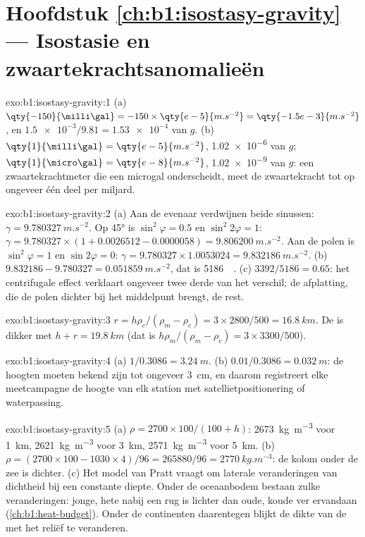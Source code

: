 \section*{Hoofdstuk \ref{ch:b1:isostasy-gravity} --- Isostasie en zwaartekrachtsanomalieën}

\begin{solution}{exo:b1:isostasy-gravity:1}
(a) $\qty{-150}{\milli\gal} = -150\times\qty{e-5}{m.s^{-2}} = \qty{-1.5e-3}{m.s^{-2}}$,
en $\num{1.5e-3}/9.81 = \num{1.53e-4}$ van $g$. (b) $\qty{1}{\milli\gal} =
\qty{e-5}{m.s^{-2}}$, \num{1.02e-6} van $g$; $\qty{1}{\micro\gal} =
\qty{e-8}{m.s^{-2}}$, \num{1.02e-9} van $g$: een zwaartekrachtmeter die een microgal onderscheidt, meet de zwaartekracht tot op ongeveer één deel per miljard.
\end{solution}

\begin{solution}{exo:b1:isostasy-gravity:2}
(a) Aan de evenaar verdwijnen beide sinussen: $\gamma = \qty{9.780327}{m.s^{-2}}$. Op
\ang{45} is $\sin^2\varphi = 0.5$ en $\sin^2 2\varphi = 1$:
$\gamma = 9.780327\times(1 + 0.0026512 - 0.0000058) = \qty{9.806200}{m.s^{-2}}$.
Aan de polen is $\sin^2\varphi = 1$ en $\sin 2\varphi = 0$:
$\gamma = 9.780327\times1.0053024 = \qty{9.832186}{m.s^{-2}}$.
(b) $9.832186 - 9.780327 = \qty{0.051859}{m.s^{-2}}$, dat is
\qty{5186}{\milli\gal}. (c) $3392/5186 = 0.65$: het centrifugale effect verklaart
ongeveer twee derde van het verschil; de afplatting, die de polen dichter bij het middelpunt brengt, de rest.
\end{solution}

\begin{solution}{exo:b1:isostasy-gravity:3}
$r = h\rho_c/(\rho_m - \rho_c) = 3\times2800/500 = \qty{16.8}{km}$. De  is
dikker met $h + r = \qty{19.8}{km}$ (dat is $h\rho_m/(\rho_m - \rho_c) =
3\times3300/500$).
\end{solution}

\begin{solution}{exo:b1:isostasy-gravity:4}
(a) $1/0.3086 = \qty{3.24}{m}$. (b) $0.01/0.3086 = \qty{0.032}{m}$: de hoogten
moeten bekend zijn tot ongeveer \qty{3}{cm}, en daarom registreert elke meetcampagne de hoogte van elk station met satellietpositionering of waterpassing.
\end{solution}

\begin{solution}{exo:b1:isostasy-gravity:5}
(a) $\rho = 2700\times100/(100 + h)$: \qty{2673}{kg.m^{-3}} voor \qty{1}{km},
\qty{2621}{kg.m^{-3}} voor \qty{3}{km}, \qty{2571}{kg.m^{-3}} voor \qty{5}{km}.
(b) $\rho = (2700\times100 - 1030\times4)/96 = \num{265880}/96 =
\qty{2770}{kg.m^{-3}}$: de kolom onder de zee is dichter. (c) Het model van Pratt vraagt om laterale veranderingen van dichtheid bij een constante diepte. Onder de oceaanbodem bestaan zulke veranderingen: jonge, hete  nabij een rug is lichter dan oude, koude  ver ervandaan (\cref{ch:b1:heat-budget}). Onder de continenten daarentegen blijkt de dikte van de  met het reliëf te veranderen.
\end{solution}


